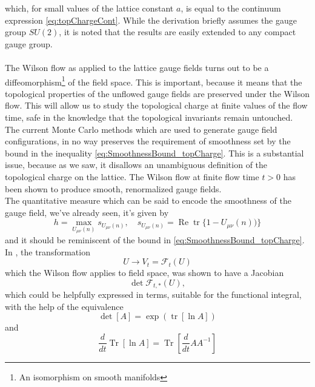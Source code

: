\documentclass[a4paper,10pt]{article}
\begin{document}
which, for small values of the lattice constant $a$, is equal to the continuum expression \eqref{eq:topChargeCont}. While the derivation briefly assumes the gauge group $SU(2)$, it is noted that the results are easily extended to any compact gauge group.\\\\The Wilson flow as applied to the lattice gauge fields turns out to be a diffeomorphism\footnote{An isomorphism on smooth manifolds} of the field space. This is important, because it means that the topological properties of the unflowed gauge fields are preserved under the Wilson flow. This will allow us to study the topological charge at finite values of the flow time, safe in the knowledge that the topological invariants remain untouched.\\ The current Monte Carlo methods which are used to generate gauge field configurations, in no way preserves the requirement of smoothness set by the bound in the inequality \eqref{eq:SmoothnessBound_topCharge}. This is a substantial issue, because as we saw, it disallows an unambiguous definition of the topological charge on the lattice. The Wilson flow at finite flow time $t>0$ has been shown to produce smooth, renormalized gauge fields.\\The quantitative measure which can be said to encode the smoothness of the gauge field, we've already seen, it's given by
\begin{equation}
h=\max _{U_{\mu \nu}(n)} s_{U_{\mu \nu}(n)}, \quad s_{U_{\mu \nu}(n)}=\operatorname{Re} \operatorname{tr}\{1-U_{\mu \nu}(n))\}
\end{equation}
and it should be reminiscent of the bound in \eqref{eq:SmoothnessBound_topCharge}.\\In \cite{LuescherMartin2009TMtW}, the transformation 
\begin{equation}
U \rightarrow V_{t}=\mathcal{F}_{t}(U)
\end{equation}
which the Wilson flow applies to field space, was shown to have a Jacobian 
\begin{equation}
\operatorname{det} \mathcal{F}_{t, *}(U),
\end{equation}
which could be helpfully expressed in terms, suitable for the functional integral, with the help of the equivalence 
\begin{equation}
\operatorname{det}[A]=\exp (\operatorname{tr}[\ln A])
\end{equation}
and
\begin{equation}
\frac{d}{dt}\operatorname{Tr}\left[ \operatorname{ln} A  \right]  = \operatorname{Tr}\left[ \frac{d}{dt}A A^{-1} \right]
\end{equation}
\end{document}
